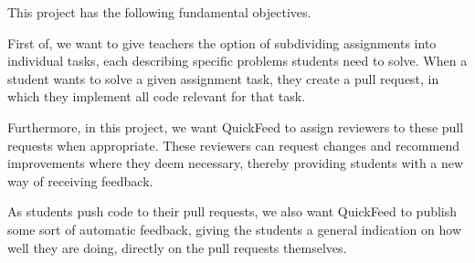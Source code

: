 This project has the following fundamental objectives.

First of, we want to give teachers the option of subdividing assignments into individual tasks, each describing specific problems students need to solve.
When a student wants to solve a given assignment task, they create a pull request, in which they implement all code relevant for that task.

Furthermore, in this project, we want QuickFeed to assign reviewers to these pull requests when appropriate.
These reviewers can request changes and recommend improvements where they deem necessary, thereby providing students with a new way of receiving feedback.

As students push code to their pull requests, we also want QuickFeed to publish some sort of automatic feedback, giving the students a general indication on how well they are doing, directly on the pull requests themselves.